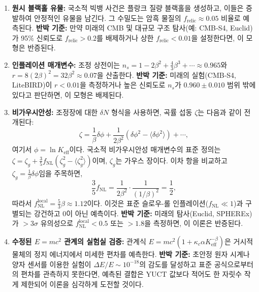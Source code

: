 \documentclass[11pt,a4paper]{article}
\newcommand{\Keff}{K_{\mathrm{eff}}}
\begin{document}
	\begin{enumerate}
		\item \textbf{원시 블랙홀 유물:} 국소적 빅뱅 사건은 플랑크 질량 블랙홀을 생성하고, 이들은 증발하여 안정적인 유물을 남긴다. 그 수밀도는 암흑 물질의 \(f_{\mathrm{relic}} \approx 0.05\) 비율로 예측된다. \textbf{반박 기준:} 만약 미래의 CMB 및 대규모 구조 탐사(예: CMB‑S4, Euclid)가 95\% 신뢰도로 \(f_{\mathrm{relic}} > 0.2\)를 배제하거나 상한 \(f_{\mathrm{relic}} < 0.01\)을 설정한다면, 이 모형은 반증된다.
		\item \textbf{인플레이션 매개변수:} 조정 상전이는 \(n_s = 1 - 2\beta^2 + \frac{4}{3}\beta^3 + \cdots \approx 0.965\)와 \(r = 8(2\beta)^2 = 32\beta^2 \approx 0.07\)을 산출한다. \textbf{반박 기준:} 미래의 실험(CMB‑S4, LiteBIRD)이 \(r < 0.01\)을 측정하거나 높은 신뢰도로 \(n_s\)가 \(0.960 \pm 0.010\) 범위 밖에 있다고 판단하면, 이 모형은 배제된다.
		\item \textbf{비가우시안성:} 조정장에 대한 \(\delta N\) 형식을 사용하면, 곡률 섭동 \(\zeta\)는 다음과 같이 전개된다:
		\[
		\zeta = \frac{1}{\beta} \delta\phi + \frac{1}{2\beta^2} (\delta\phi^2 - \langle\delta\phi^2\rangle) + \cdots,
		\]
		여기서 \(\phi = \ln \Keff\)이다. 국소적 비가우시안성 매개변수의 표준 정의는 \(\zeta = \zeta_g + \frac{3}{5} f_{\mathrm{NL}} (\zeta_g^2 - \langle\zeta_g^2\rangle)\)이며, \(\zeta_g\)는 가우스 장이다. 이차 항을 비교하고 \(\zeta_g = \frac{1}{\beta}\delta\phi\)임을 주목하면,
		\[
		\frac{3}{5} f_{\mathrm{NL}} = \frac{1}{2\beta^2} \cdot \frac{1}{(1/\beta)^2} = \frac{1}{2},
		\]
		따라서 \(f_{\mathrm{NL}}^{\mathrm{local}} = \frac{5}{3}\beta \approx 1.12\)이다. 이것은 표준 슬로우-롤 인플레이션(\(f_{\mathrm{NL}} \ll 1\))과 구별되는 강건하고 0이 아닌 예측이다. \textbf{반박 기준:} 미래의 탐사(Euclid, SPHEREx)가 \(>3\sigma\) 유의성으로 \(f_{\mathrm{NL}}^{\mathrm{local}} < 0.5\) 또는 \(> 1.8\)을 측정하면, 이 이론은 반증된다.
		\item \textbf{수정된 \(E=mc^2\) 관계의 실험실 검증:} 관계식 \(E = m c^2 (1 + \kappa_c \alpha K_{\mathrm{eff}}^{-\beta})\)은 거시적 물체의 정지 에너지에서 미세한 편차를 예측한다. \textbf{반박 기준:} 초안정 원자 시계나 양자 센서를 이용한 실험이 \(\Delta E / E \sim 10^{-18}\)의 감도를 달성하고 표준 공식으로부터의 편차를 관측하지 못한다면, 예측된 결합은 YUCT 값보다 적어도 한 자릿수 작게 제한되어 이론을 심각하게 도전할 것이다.
	\end{enumerate}
	
\end{document}
